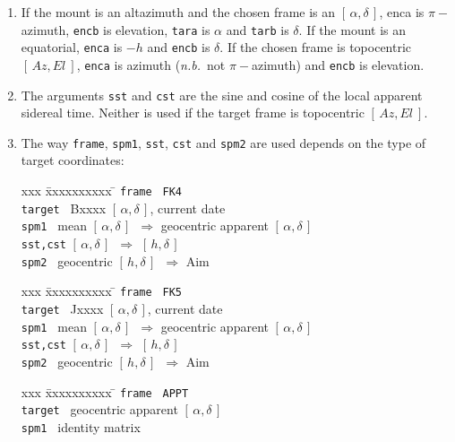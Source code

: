 \documentclass[12pt,fleqn,twoside]{article}
\renewcommand{\_}{{\tt\char'137}}     %
\newcommand{\radec}     {$[\,\alpha,\delta\,]$}
\newcommand{\hadec}     {$[\,h,\delta\,]$}
\newcommand{\azel}      {$[\,Az,El~]$}
\newcommand{\xy}        {$[\,x,y\,]$}
\begin{document}
{\begin{enumerate}
      A convenient way to apply the offsets is as ``offsets from base'',
      leaving the original pointing-origin \xy\ intact.
\item If the mount is an altazimuth and the chosen frame is an
      \radec, enca is $\pi-$azimuth, {\tt encb} is elevation,
      {\tt tara} is $\alpha$ and {\tt tarb} is $\delta$.  If the mount
      is an equatorial, {\tt enca} is $-h$ and {\tt encb} is $\delta$.
      If the chosen
      frame is topocentric \azel, {\tt enca} is azimuth
      ({\it n.b.}~not $\pi-$azimuth) and {\tt encb} is elevation.
\item The arguments {\tt sst} and {\tt cst} are the
      sine and cosine of the local
      apparent sidereal time.  Neither is used if the target frame is
      topocentric \azel.
\item The way {\tt frame}, {\tt spm1}, {\tt sst}, {\tt cst} and
      {\tt spm2} are used depends on the type of target coordinates:
      \begin{tabbing}
         xxx \= xxxxxxxxxx \= \kill
         \> {\tt frame  } \> {\tt FK4} \\
         \> {\tt target } \> Bxxxx \radec, current date \\
         \> {\tt spm1   } \>
                 mean \radec\ $\Rightarrow$ geocentric apparent \radec \\
         \> {\tt sst,cst} \> \radec\ $\Rightarrow$ \hadec \\
         \> {\tt spm2   } \>  geocentric \hadec\ $\Rightarrow$ {\sc Aim}
      \end{tabbing}
      \begin{tabbing}
         xxx \= xxxxxxxxxx \= \kill
         \> {\tt frame  } \> {\tt FK5} \\
         \> {\tt target } \> Jxxxx \radec, current date \\
         \> {\tt spm1   } \>
                 mean \radec\ $\Rightarrow$ geocentric apparent \radec \\
         \> {\tt sst,cst} \> \radec\ $\Rightarrow$ \hadec \\
         \> {\tt spm2   } \> geocentric \hadec\ $\Rightarrow$ {\sc Aim}
      \end{tabbing}
      \begin{tabbing}
         xxx \= xxxxxxxxxx \= \kill
         \> {\tt frame  } \> {\tt APPT} \\
         \> {\tt target } \> geocentric apparent \radec \\
         \> {\tt spm1   } \> identity matrix \\

\end{tabbing}
\end{enumerate}}
\end{document}
